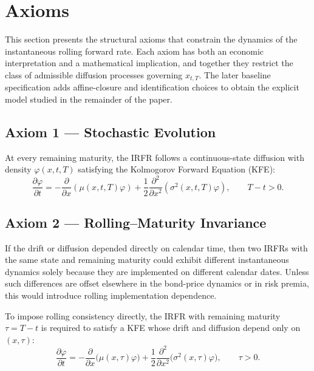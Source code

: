 \documentclass[12pt]{article}
\theoremstyle{statementstyle}
\begin{document}
\section{Axioms}
\label{sec:axioms}

This section presents the structural axioms that constrain the dynamics
of the instantaneous rolling forward rate. Each axiom has both an economic
interpretation and a mathematical implication, and together they restrict
the class of admissible diffusion processes governing $x_{t,T}$. The later
baseline specification adds affine-closure and identification choices to obtain
the explicit model studied in the remainder of the paper.

\subsection*{Axiom 1 --- Stochastic Evolution}
\label{ax:stochastic}

At every remaining maturity, the IRFR follows a continuous-state 
diffusion with density $\varphi(x,t,T)$ satisfying the Kolmogorov 
Forward Equation (KFE):
\begin{equation}
\frac{\partial \varphi}{\partial t}
=
-\frac{\partial}{\partial x}(\mu(x,t,T)\varphi)
+ \frac12 \frac{\partial^{2}}{\partial x^{2}}
\!\left(\sigma^{2}(x,t,T)\varphi\right),
\qquad T - t > 0.
\tag{2.0.1}\label{eq:axiom1}
\end{equation}

\subsection*{Axiom 2 --- Rolling--Maturity Invariance}
\label{ax:rolling}

If the drift or diffusion depended directly on calendar time, then two
IRFRs with the same state and remaining maturity could exhibit different
instantaneous dynamics solely because they are implemented on different
calendar dates. Unless such differences are offset elsewhere in the bond-price
dynamics or in risk premia, this would introduce rolling implementation
dependence.

To impose rolling consistency directly, the IRFR with remaining maturity
$\tau = T - t$ is required to satisfy a KFE whose drift and diffusion depend
only on $(x,\tau)$:
\begin{equation}
\frac{\partial \varphi}{\partial t}
=
-\frac{\partial}{\partial x}\bigl(\mu(x,\tau)\varphi\bigr)
+ \frac12 \frac{\partial^{2}}{\partial x^{2}}
\bigl(\sigma^{2}(x,\tau)\varphi\bigr),
\qquad \tau > 0.
\tag{2.0.2}\label{eq:axiom2}
\end{equation}
\end{document}
